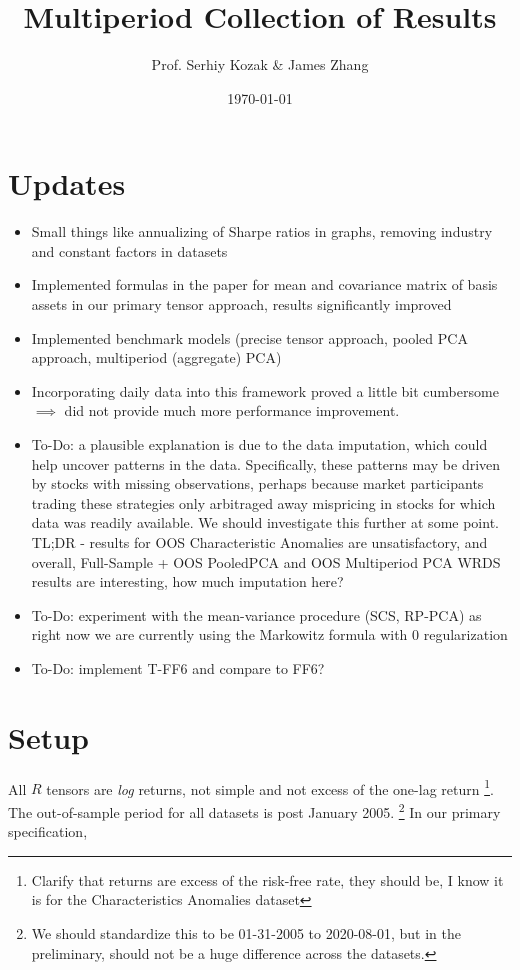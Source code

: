 \documentclass{article}
\title{Multiperiod Collection of Results}
\author{Prof. Serhiy Kozak \& James Zhang}
\date{\today}
\begin{document}
\maketitle

\tableofcontents

\newpage

\section*{Updates}
\begin{itemize}
    \item Small things like annualizing of Sharpe ratios in graphs, removing industry and constant factors in datasets
    \item Implemented formulas in the paper for mean and covariance matrix of basis assets in our primary tensor approach, results significantly improved
    \item Implemented benchmark models (precise tensor approach, pooled PCA approach, multiperiod (aggregate) PCA)
    \item Incorporating daily data into this framework proved a little bit cumbersome $\implies$ did not 
    provide much more performance improvement.
    \item To-Do: a plausible explanation is due to the data imputation, which could help uncover patterns in the data. Specifically, these patterns may be driven by stocks with missing observations, perhaps because market participants trading these strategies
    only arbitraged away mispricing in stocks for which data was readily available. We should investigate this further at some point. TL;DR - results for OOS Characteristic Anomalies are unsatisfactory, 
    and overall, Full-Sample + OOS PooledPCA and OOS Multiperiod PCA WRDS results are interesting, how much imputation here?
    \item To-Do: experiment with the mean-variance procedure (SCS, RP-PCA) as right now we are currently using the Markowitz formula with $0$ regularization
    \item To-Do: implement T-FF6 and compare to FF6?
\end{itemize}

\section{Setup}

All $R$ tensors are \emph{log} returns, not simple and not excess of the one-lag return \footnote{Clarify that returns are excess of the risk-free rate, they should be, I know it is for the Characteristics Anomalies dataset}. 
The out-of-sample period for all datasets is 
post January 2005. \footnote{We should standardize this to be 01-31-2005 to 2020-08-01, but in the preliminary, should not be a huge difference across 
the datasets.} In our primary specification, 
\end{document}
